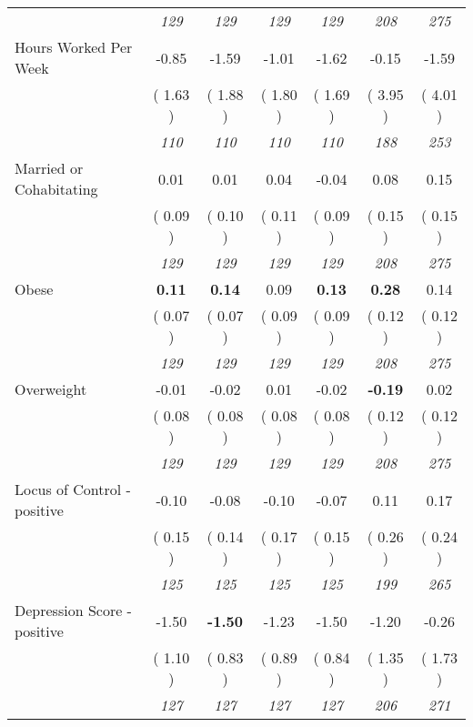 \begin{tabular}{l c c c c c c}
& \textit{ 129 } & \textit{ 129 } & \textit{ 129 } & \textit{ 129 } & \textit{ 208 } & \textit{ 275 } \\
Hours Worked Per Week &     -0.85 &     -1.59 &     -1.01 &     -1.62 &     -0.15 &     -1.59 \\
& (     1.63 ) & (     1.88 ) & (     1.80 ) & (     1.69 ) & (     3.95 ) & (     4.01 ) \\
& \textit{ 110 } & \textit{ 110 } & \textit{ 110 } & \textit{ 110 } & \textit{ 188 } & \textit{ 253 } \\
Married or Cohabitating &      0.01 &      0.01 &      0.04 &     -0.04 &      0.08 &      0.15 \\
& (     0.09 ) & (     0.10 ) & (     0.11 ) & (     0.09 ) & (     0.15 ) & (     0.15 ) \\
& \textit{ 129 } & \textit{ 129 } & \textit{ 129 } & \textit{ 129 } & \textit{ 208 } & \textit{ 275 } \\
Obese & \textbf{      0.11 } & \textbf{      0.14 } &      0.09 & \textbf{     0.13} & \textbf{      0.28 } &      0.14 \\
& (     0.07 ) & (     0.07 ) & (     0.09 ) & (     0.09 ) & (     0.12 ) & (     0.12 ) \\
& \textit{ 129 } & \textit{ 129 } & \textit{ 129 } & \textit{ 129 } & \textit{ 208 } & \textit{ 275 } \\
Overweight &     -0.01 &     -0.02 &      0.01 &     -0.02 & \textbf{     -0.19 } &      0.02 \\
& (     0.08 ) & (     0.08 ) & (     0.08 ) & (     0.08 ) & (     0.12 ) & (     0.12 ) \\
& \textit{ 129 } & \textit{ 129 } & \textit{ 129 } & \textit{ 129 } & \textit{ 208 } & \textit{ 275 } \\
Locus of Control - positive &     -0.10 &     -0.08 &     -0.10 &     -0.07 &      0.11 &      0.17 \\
& (     0.15 ) & (     0.14 ) & (     0.17 ) & (     0.15 ) & (     0.26 ) & (     0.24 ) \\
& \textit{ 125 } & \textit{ 125 } & \textit{ 125 } & \textit{ 125 } & \textit{ 199 } & \textit{ 265 } \\
Depression Score - positive &     -1.50 & \textbf{     -1.50 } &     -1.23 &     -1.50 &     -1.20 &     -0.26 \\
& (     1.10 ) & (     0.83 ) & (     0.89 ) & (     0.84 ) & (     1.35 ) & (     1.73 ) \\
& \textit{ 127 } & \textit{ 127 } & \textit{ 127 } & \textit{ 127 } & \textit{ 206 } & \textit{ 271 } \\

\end{tabular}
